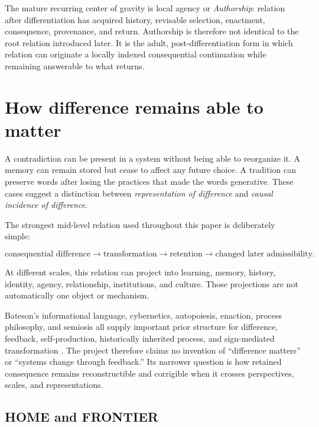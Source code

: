 \documentclass[11pt]{article}
\begin{document}
The mature recurring center of gravity is local agency or \emph{Authorship}: relation after differentiation has acquired history, revisable selection, enactment, consequence, provenance, and return. Authorship is therefore not identical to the root relation introduced later. It is the adult, post-differentiation form in which relation can originate a locally indexed consequential continuation while remaining answerable to what returns.

\section{How difference remains able to matter}

A contradiction can be present in a system without being able to reorganize it. A memory can remain stored but cease to affect any future choice. A tradition can preserve words after losing the practices that made the words generative. These cases suggest a distinction between \emph{representation of difference} and \emph{causal incidence of difference}.

The strongest mid-level relation used throughout this paper is deliberately simple:

\begin{equation}
\text{consequential difference}
\rightarrow \text{transformation}
\rightarrow \text{retention}
\rightarrow \text{changed later admissibility}.
\end{equation}

At different scales, this relation can project into learning, memory, history, identity, agency, relationship, institutions, and culture. Those projections are not automatically one object or mechanism.

Bateson's informational language, cybernetics, autopoiesis, enaction, process philosophy, and semiosis all supply important prior structure for difference, feedback, self-production, historically inherited process, and sign-mediated transformation \cite{Bateson1972,MaturanaVarela1980Autopoiesis,Pattee2001EpistemicCut,PeirceSemioticsSEP,Whitehead1978Process,VonFoerster2003Understanding}. The project therefore claims no invention of ``difference matters'' or ``systems change through feedback.'' Its narrower question is how retained consequence remains reconstructible and corrigible when it crosses perspectives, scales, and representations.

\subsection{HOME and FRONTIER}
\end{document}
